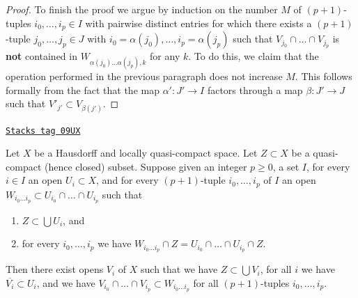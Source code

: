 \begin{proof}
\medskip\noindent
To finish the proof we argue by induction on the number $M$ of $(p + 1)$-tuples
$i_0, \ldots, i_p \in I$ with pairwise distinct entries for which there exists
a $(p + 1)$-tuple $j_0, \ldots, j_p \in J$ with
$i_0 = \alpha(j_0), \ldots, i_p = \alpha(j_p)$ such that
$V_{j_0} \cap \ldots \cap V_{j_p}$ is {\bf not} contained in
$W_{\alpha(j_0) \ldots \alpha(j_p), k}$ for any $k$. To do this, we
claim that the operation performed in the previous paragraph does not
increase $M$. This follows formally from the fact that the map
$\alpha' : J' \to I$ factors through a map $\beta : J' \to J$
such that $V'_{j'} \subset V_{\beta(j')}$.
\end{proof}

\begin{lemma}
\label{topology-lemma-lift-covering-of-a-closed}
\href{https://stacks.math.columbia.edu/tag/09UX}{\texttt{Stacks tag 09UX}}

Let $X$ be a Hausdorff and locally quasi-compact space.
Let $Z \subset X$ be a quasi-compact (hence closed) subset.
Suppose given an integer $p \geq 0$, a set $I$, for every $i \in I$
an open $U_i \subset X$, and for every $(p + 1)$-tuple
$i_0, \ldots, i_p$ of $I$ an open
$W_{i_0 \ldots i_p} \subset U_{i_0} \cap \ldots \cap U_{i_p}$
such that
\begin{enumerate}
\item $Z \subset \bigcup U_i$, and
\item for every $i_0, \ldots, i_p$ we have
$W_{i_0 \ldots i_p} \cap Z = U_{i_0} \cap \ldots \cap U_{i_p} \cap Z$.
\end{enumerate}
Then there exist opens $V_i$ of $X$ such that
we have $Z \subset \bigcup V_i$,
for all $i$ we have $\overline{V_i} \subset U_i$, and
we have $V_{i_0} \cap \ldots \cap V_{i_p} \subset W_{i_0 \ldots i_p}$
for all $(p + 1)$-tuples $i_0, \ldots, i_p$.
\end{lemma}

